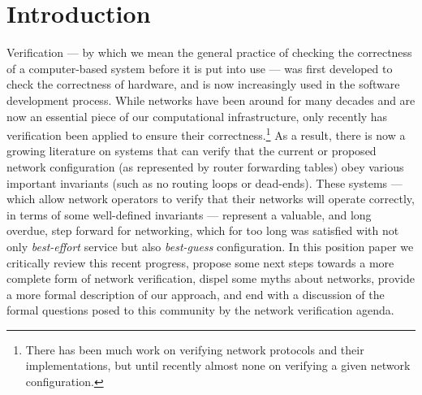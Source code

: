 \section{Introduction}
\label{sec:introduction}

Verification --- by which we mean the general practice of checking the correctness of a computer-based system before it is put into use --- was first developed to
check the correctness of hardware, and is now increasingly used in the software development process. While networks have been around for many decades and are now an essential piece of our computational infrastructure, only recently has verification been applied to ensure their correctness.\footnote{There has been much work on verifying network protocols and their implementations, but until recently almost none on verifying a given network configuration.} As a result, there is now a growing literature on systems that can verify that the current or proposed network configuration (as represented by router forwarding tables) obey various important invariants (such as no routing loops or dead-ends).
These systems --- which allow network operators to verify that their networks will operate correctly, in terms of some well-defined invariants --- represent a valuable, and long overdue, step forward for networking, which for too long was satisfied with not only {\em best-effort} service but also {\em best-guess} configuration. In this position paper we critically review this recent progress, propose some next steps towards a more complete form of network verification, dispel some myths about networks, provide a more formal description of our approach, and end with a discussion of the formal questions posed to this community by the network verification agenda.

